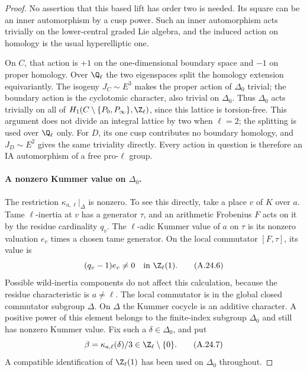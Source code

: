 \begin{proof}
No assertion that this based lift has order two is needed.
Its square can be an inner automorphism by a cusp power.
Such an inner automorphism acts trivially on the
lower-central graded Lie algebra, and the induced action on
homology is the usual hyperelliptic one.

On $C$, that action is $+1$ on the one-dimensional boundary
space and $-1$ on proper homology. Over $\Q_\ell$ the two
eigenspaces split the homology extension equivariantly.
The isogeny $J_C\sim E^3$ makes the proper action of $\Delta_0$
trivial; the boundary action is the cyclotomic character,
also trivial on $\Delta_0$. Thus $\Delta_0$ acts trivially on
all of $H_1(C\setminus\{P_0,P_\infty\},\Z_\ell)$, since this
lattice is torsion-free. This argument does not divide an
integral lattice by two when $\ell=2$; the splitting is used
over $\Q_\ell$ only. For $D$, its one cusp contributes no
boundary homology, and $J_D\sim E^2$ gives the same
triviality directly. Every action in question is therefore
an IA automorphism of a free pro-$\ell$ group.

\paragraph{A nonzero Kummer value on $\Delta_0$.}
The restriction $\kappa_{a,\ell}|_\Delta$ is nonzero. To see
this directly, take a place $v$ of $K$ over $a$. Tame
$\ell$-inertia at $v$ has a generator $\tau$, and an
arithmetic Frobenius $F$ acts on it by the residue
cardinality $q_v$. The $\ell$-adic Kummer value of $a$ on
$\tau$ is its nonzero valuation $e_v$ times a chosen tame
generator. On the local commutator $[F,\tau]$, its value is
\[
                        (q_v-1)e_v\ne0
                       \quad\hbox{in }\Z_\ell(1).
                                                        \tag{A.24.6}
\]
Possible wild-inertia components do not affect this
calculation, because the residue characteristic is
$a\ne\ell$. The local commutator is in the global closed
commutator subgroup $\Delta$. On $\Delta$ the Kummer
cocycle is an additive character. A positive power of this
element belongs to the finite-index subgroup $\Delta_0$
and still has nonzero Kummer value. Fix such a
$\delta\in\Delta_0$, and put
\[
                         \beta=\kappa_{a,\ell}(\delta)/3
                              \in\Z_\ell\setminus\{0\}.
                                                        \tag{A.24.7}
\]
A compatible identification of $\Z_\ell(1)$ has been used
on $\Delta_0$ throughout.


\end{proof}
